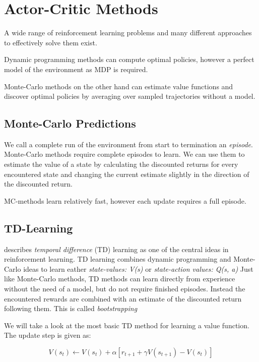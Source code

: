 \section{Actor-Critic Methods}
\raggedbottom 
A wide range of reinforcement learning problems and many different approaches to effectively solve them exist.

Dynamic programming methods can compute optimal policies, however a perfect model of the environment as MDP is required.

Monte-Carlo methods on the other hand can estimate value functions and discover optimal policies by averaging over sampled trajectories without a model.

\subsection{Monte-Carlo Predictions}

We call a complete run of the environment from start to termination an \textit{episode}.
Monte-Carlo methods require complete episodes to learn. We can use them to estimate the value of a state by calculating the discounted returns for every encountered state and changing the current estimate slightly in the direction of the discounted return.

MC-methods learn relatively fast, however each update requires a full episode.

\subsection{TD-Learning}

\cite{Sut98} describes \textit{temporal difference} (TD) learning as one of the central ideas in reinforcement learning.
TD learning combines dynamic programming and Monte-Carlo ideas to learn eather \textit{state-values: V(s)} or \textit{state-action values: Q(s, a)}
Just like Monte-Carlo methods, TD methods can learn directly from experience without the need of a model, but do not require finished episodes. Instead the encountered rewards are combined with an estimate of the discounted return following them. This is called \textit{bootstrapping}

We will take a look at the most basic TD method for learning a value function. 
The update step is given as:

\begin{equation}
V(s_t)\gets V(s_t)+ \alpha [r_{t+1} + \gamma V(s_{t+1})-V(s_t)]
\end{equation}

